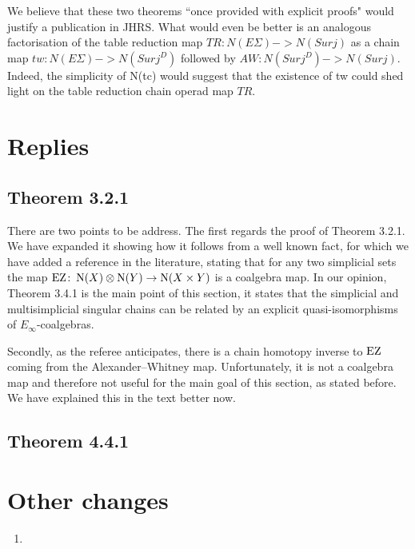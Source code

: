 \documentclass{amsart}
\begin{document}
	We believe that these two theorems ``once provided with explicit proofs" would justify a publication in JHRS.
	What would even be better is an analogous factorisation of the table reduction map $TR:N(E\Sigma)->N(Surj)$ as a chain map $tw:N(E\Sigma)->N(Surj^D)$ followed by $AW:N(Surj^D)->N(Surj)$.
	Indeed, the simplicity of N(tc) would suggest that the existence of tw could shed light on the table reduction chain operad map $TR$.

	\section{Replies}

	\subsection{Theorem 3.2.1}

	There are two points to be address.
	The first regards the proof of Theorem 3.2.1.
	We have expanded it showing how it follows from a well known fact, for which we have added a reference in the literature, stating that for any two simplicial sets the map $\operatorname{EZ} \colon \operatorname{N}(X) \otimes \operatorname{N}(Y) \to \operatorname{N}(X \times Y)$ is a coalgebra map.
	In our opinion, Theorem 3.4.1 is the main point of this section, it states that the simplicial and multisimplicial singular chains can be related by an explicit quasi-isomorphisms of $E_\infty$-coalgebras.

	Secondly, as the referee anticipates, there is a chain homotopy inverse to $\operatorname{EZ}$ coming from the Alexander--Whitney map.
	Unfortunately, it is not a coalgebra map and therefore not useful for the main goal of this section, as stated before.
	We have explained this in the text better now.

	\subsection{Theorem 4.4.1}

	\section{Other changes}

	\begin{enumerate}
		\item
	\end{enumerate}
\end{document}
